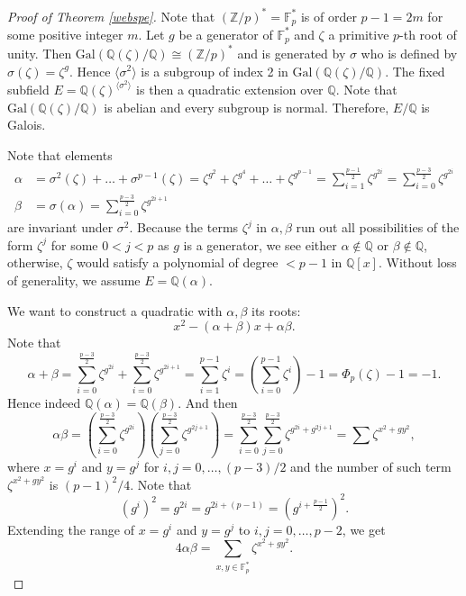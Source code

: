 \documentclass[12pt]{report}
\theoremstyle{definition}
\newcommand{\gal}{\text{Gal}}
\newcommand{\zz}{\mathbb{Z}}
\newcommand{\ta}[1]{\langle #1 \rangle}
\newcommand{\ff}{\mathbb{F}}
\newcommand{\qq}{\mathbb{Q}}
\begin{document}
\begin{proof}[Proof of Theorem \ref{webspe}]
	Note that $(\zz/p)^*=\ff_p^*$ is of order $p-1=2m$ for some positive integer $m$. Let $g$ be a generator of $\ff_p^*$ and $\zeta$ a primitive $p$-th root of unity. Then $\gal(\qq(\zeta)/\qq)\cong (\zz/p)^*$ and is generated by $\sigma$ who is defined by $\sigma(\zeta)=\zeta^g$. Hence $\ta{\sigma^2}$ is a subgroup of index 2 in $\gal(\qq(\zeta)/\qq)$. The fixed subfield $E=\qq(\zeta)^{\ta{\sigma^2}}$ is then a quadratic extension over $\qq$. Note that $\gal(\qq(\zeta)/\qq)$ is abelian and every subgroup is normal. Therefore, $E/\qq$ is Galois.

	Note that elements
	\begin{align*}
		\alpha & =\sigma^2(\zeta)+\dots+\sigma^{p-1}(\zeta)=\zeta^{g^2}+\zeta^{g^4}+\dots+\zeta^{g^{p-1}}=\sum_{i=1}^{\frac{p-1}{2}}\zeta^{g^{2i}} = \sum_{i=0}^{\frac{p-3}{2}}\zeta^{g^{2i}} \\
		\beta  & =\sigma(\alpha)= \sum_{i=0}^{\frac{p-3}{2}}\zeta^{g^{2i+1}}
	\end{align*} are invariant under $\sigma^2$. Because the terms $\zeta^{j}$ in $\alpha,\beta$ run out all possibilities of the form $\zeta^j$ for some $0<j<p$ as $g$ is a generator, we see either $\alpha\notin \qq$  or $\beta\not\in \qq$, otherwise, $\zeta$ would satisfy a polynomial of degree $< p-1$ in $\qq[x]$. Without loss of generality, we assume $E=\qq(\alpha)$.


	We want to construct a quadratic with $\alpha,\beta$ its roots: \[x^2-(\alpha+\beta)x+\alpha\beta.\] Note that \[\alpha+\beta =\sum_{i=0}^{\frac{p-3}{2}}\zeta^{g^{2i}}+\sum_{i=0}^{\frac{p-3}{2}}\zeta^{g^{2i+1}} =\sum_{i=1}^{p-1} \zeta^i =(\sum_{i=0}^{p-1} \zeta^i) -1=\Phi_p(\zeta)-1=-1.\] Hence indeed $\qq(\alpha)=\qq(\beta)$. And then
	\[\alpha\beta =  (\sum_{i=0}^{\frac{p-3}{2}}\zeta^{g^{2i}})(\sum_{j=0}^{\frac{p-3}{2}}\zeta^{g^{2j+1}})= \sum_{i=0}^{\frac{p-3}{2}}\sum_{j=0}^{\frac{p-3}{2}} \zeta^{g^{2i}+g^{2j+1}}= \sum \zeta^{x^2+gy^2},\] where $x=g^i$ and $y=g^j$ for $i,j=0,\dots,(p-3)/2$ and the number of such term $\zeta^{x^2+gy^2}$ is $(p-1)^2/4$. Note that \[(g^i)^2=g^{2i}=g^{2i+(p-1)}=(g^{i+\frac{p-1}{2}})^2.\]
	Extending the range of $x=g^i$ and $y=g^j$ to $i,j=0,\dots, p-2$, we get  \[4\alpha\beta=\sum_{x,y\in \ff_p^*} \zeta^{x^2+gy^2}.\]


\end{proof}
\end{document}
